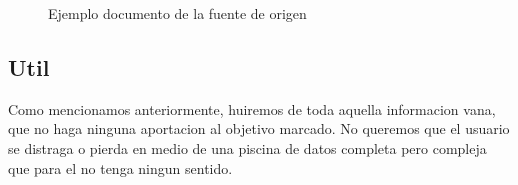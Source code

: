 \begin{figure}[ht]
\centering
{}
\caption{Ejemplo documento de la fuente de origen}
\end{figure}
\begin{comment}
    
\end{co}
\begin{itemize}

    \item Informacion precisa
    \item Datos contrastados
\end{itemize}
\end{comment}


\subsection{Util}
Como mencionamos anteriormente, huiremos de toda aquella informacion vana, que no haga ninguna aportacion
al objetivo marcado. No queremos que el usuario se distraga o pierda en medio de una piscina de datos completa
pero compleja que para el no tenga ningun sentido.\\

